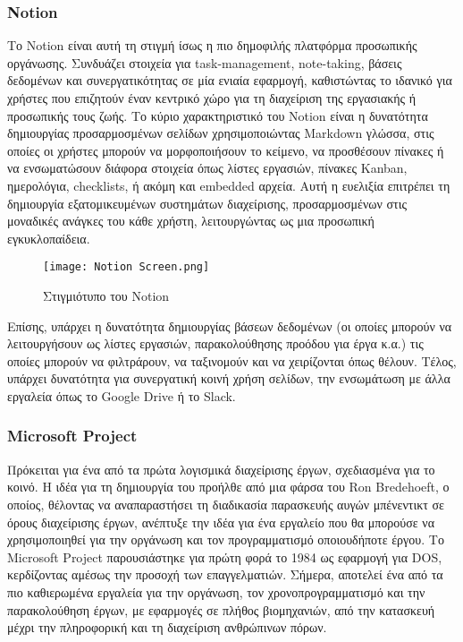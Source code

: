             \subsubsection{Notion}
                Το Notion \cite{Notion} είναι αυτή τη στιγμή ίσως η πιο δημοφιλής πλατφόρμα προσωπικής οργάνωσης. Συνδυάζει στοιχεία για task-management, note-taking, βάσεις δεδομένων και συνεργατικότητας σε μία ενιαία εφαρμογή, καθιστώντας το ιδανικό για χρήστες που επιζητούν έναν κεντρικό χώρο για τη διαχείριση της εργασιακής ή προσωπικής τους ζωής. Το κύριο χαρακτηριστικό του Notion είναι η δυνατότητα δημιουργίας προσαρμοσμένων σελίδων χρησιμοποιώντας Markdown γλώσσα, στις οποίες οι χρήστες μπορούν να μορφοποιήσουν το κείμενο, να προσθέσουν πίνακες ή να ενσωματώσουν διάφορα στοιχεία όπως λίστες εργασιών, πίνακες Kanban, ημερολόγια, checklists, ή ακόμη και embedded αρχεία. Αυτή η ευελιξία επιτρέπει τη δημιουργία εξατομικευμένων συστημάτων διαχείρισης, προσαρμοσμένων στις μοναδικές ανάγκες του κάθε χρήστη, λειτουργώντας ως μια προσωπική εγκυκλοπαίδεια.

                \begin{figure}[h!] \noindent \centering
                    \texttt{[image: Notion Screen.png]}
                    \caption{\centering Στιγμιότυπο του Notion}
                \end{figure}

                Επίσης, υπάρχει η δυνατότητα δημιουργίας βάσεων δεδομένων (οι οποίες μπορούν να λειτουργήσουν ως λίστες εργασιών, παρακολούθησης προόδου για έργα κ.α.) τις οποίες μπορούν να φιλτράρουν, να ταξινομούν και να χειρίζονται όπως θέλουν. Τέλος, υπάρχει δυνατότητα για συνεργατική κοινή χρήση σελίδων, την ενσωμάτωση με άλλα εργαλεία όπως το Google Drive ή το Slack.

            \subsubsection{Microsoft Project}
                Πρόκειται για ένα από τα πρώτα λογισμικά διαχείρισης έργων, σχεδιασμένα για το κοινό. Η ιδέα για τη δημιουργία του προήλθε από μια φάρσα του Ron Bredehoeft, ο οποίος, θέλοντας να αναπαραστήσει τη διαδικασία παρασκευής αυγών μπένεντικτ σε όρους διαχείρισης έργων, ανέπτυξε την ιδέα για ένα εργαλείο που θα μπορούσε να χρησιμοποιηθεί για την οργάνωση και τον προγραμματισμό οποιουδήποτε έργου. Το Microsoft Project παρουσιάστηκε για πρώτη φορά το 1984 ως εφαρμογή για DOS, κερδίζοντας αμέσως την προσοχή των επαγγελματιών. Σήμερα, αποτελεί ένα από τα πιο καθιερωμένα εργαλεία για την οργάνωση, τον χρονοπρογραμματισμό και την παρακολούθηση έργων, με εφαρμογές σε πλήθος βιομηχανιών, από την κατασκευή μέχρι την πληροφορική και τη διαχείριση ανθρώπινων πόρων.

